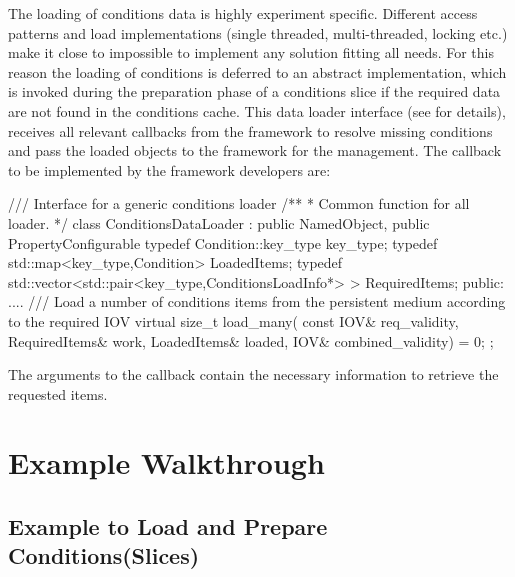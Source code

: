 \documentclass[10pt,a4paper]{article}
\begin{document}
\noindent
The loading of conditions data is highly experiment specific. Different 
access patterns and load implementations (single threaded, multi-threaded, locking etc.)
make it close to impossible to implement any solution fitting all needs.
For this reason the loading of conditions is deferred to an abstract implementation,
which is invoked during the preparation phase of a conditions slice if the required
data are not found in the conditions cache. This data loader interface
(see 
for details), receives all relevant callbacks from the framework to resolve 
missing conditions and pass the loaded objects to the framework for the management.
The callback to be implemented by the framework developers are:
\begin{unnumberedcode}
/// Interface for a generic conditions loader
/** 
 *  Common function for all loader.
 */
class ConditionsDataLoader : public NamedObject, public PropertyConfigurable   {
  typedef Condition::key_type                                   key_type;
  typedef std::map<key_type,Condition>                          LoadedItems;
  typedef std::vector<std::pair<key_type,ConditionsLoadInfo*> > RequiredItems;
public:
  ....
  /// Load a number of conditions items from the persistent medium according to the required IOV
  virtual size_t load_many(  const IOV&       req_validity,
                             RequiredItems&   work,
                             LoadedItems&     loaded,
                             IOV&             combined_validity) = 0;
};
\end{unnumberedcode}
The arguments to the callback contain the necessary information to retrieve
the requested items.

\newpage
\section{Example Walkthrough}
\label{sec:ddcond-example}

\subsection{Example to Load and Prepare Conditions(Slices)}
\label{subsec:ddcond-example-loading}
\end{document}
